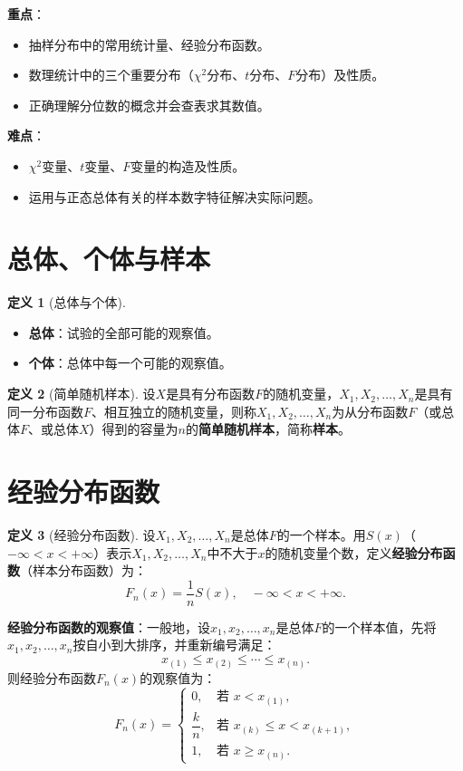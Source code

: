 \documentclass[11pt,a4paper]{report}
\theoremstyle{definition}
\newtheorem{definition}{定义}[chapter]
\theoremstyle{plain}
\begin{document}
\textbf{重点}：
\begin{itemize}[leftmargin=2em]
    \item 抽样分布中的常用统计量、经验分布函数。
    \item 数理统计中的三个重要分布（$\chi^2$分布、$t$分布、$F$分布）及性质。
    \item 正确理解分位数的概念并会查表求其数值。
\end{itemize}

\textbf{难点}：
\begin{itemize}[leftmargin=2em]
    \item $\chi^2$变量、$t$变量、$F$变量的构造及性质。
    \item 运用与正态总体有关的样本数字特征解决实际问题。
\end{itemize}

\section{总体、个体与样本}

\begin{definition}[总体与个体]
\begin{itemize}[leftmargin=2em]
    \item \textbf{总体}：试验的全部可能的观察值。
    \item \textbf{个体}：总体中每一个可能的观察值。
\end{itemize}
\end{definition}

\begin{definition}[简单随机样本]
设$X$是具有分布函数$F$的随机变量，$X_1,X_2,\ldots,X_n$是具有同一分布函数$F$、相互独立的随机变量，则称$X_1,X_2,\ldots,X_n$为从分布函数$F$（或总体$F$、或总体$X$）得到的容量为$n$的\textbf{简单随机样本}，简称\textbf{样本}。
\end{definition}

\section{经验分布函数}

\begin{definition}[经验分布函数]
设$X_1,X_2,\ldots,X_n$是总体$F$的一个样本。用$S(x)$（$-\infty<x<+\infty$）表示$X_1,X_2,\ldots,X_n$中不大于$x$的随机变量个数，定义\textbf{经验分布函数}（样本分布函数）为：
\[
F_n(x)=\frac{1}{n}S(x),\quad -\infty<x<+\infty.
\]
\end{definition}

\textbf{经验分布函数的观察值}：一般地，设$x_1,x_2,\ldots,x_n$是总体$F$的一个样本值，先将$x_1,x_2,\ldots,x_n$按自小到大排序，并重新编号满足：
\[
x_{(1)}\leq x_{(2)}\leq\cdots\leq x_{(n)}.
\]
则经验分布函数$F_n(x)$的观察值为：
\[
F_n(x)=
\begin{cases}
0, & \text{若 }x<x_{(1)},\\[4pt]
\dfrac{k}{n}, & \text{若 }x_{(k)}\leq x<x_{(k+1)},\\[8pt]
1, & \text{若 }x\geq x_{(n)}.
\end{cases}
\]
\end{document}
